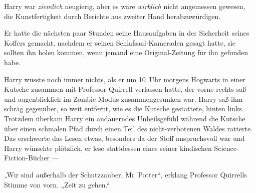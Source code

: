 Harry war \emph{ziemlich} neugierig, aber es wäre \emph{wirklich} nicht angemessen gewesen, die Kunstfertigkeit durch Berichte aus zweiter Hand herabzuwürdigen.

Er hatte die nächsten paar Stunden seine Hausaufgaben in der Sicherheit seines Koffers gemacht, nachdem er seinen Schlafsaal-Kameraden gesagt hatte, sie sollten ihn holen kommen, wenn jemand eine Original-Zeitung für ihn gefunden habe.

Harry wusste noch immer nichts, als er um 10~Uhr morgens Hogwarts in einer Kutsche zusammen mit Professor Quirrell verlassen hatte, der vorne rechts saß und augenblicklich im Zombie-Modus zusammengesunken war. Harry saß ihm schräg gegenüber, so weit entfernt, wie es die Kutsche gestattete, hinten links. Trotzdem überkam Harry ein andauerndes Unheilsgefühl während die Kutsche über einen schmalen Pfad durch einen Teil des nicht-verbotenen Waldes ratterte. Das erschwerte das Lesen etwas, besonders da der Stoff anspruchsvoll war und Harry wünschte plötzlich, er lese stattdessen eines seiner kindischen Science-Fiction-Bücher —

„Wir sind außerhalb der Schutzzauber, Mr~Potter“, erklang Professor Quirrells Stimme von vorn.
„Zeit zu gehen.“

